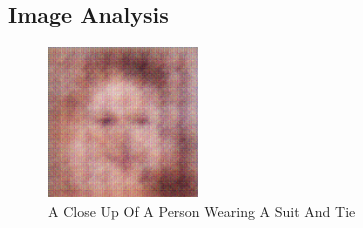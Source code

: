 \documentclass{article}%
\begin{document}
%
\subsection{Image Analysis}%
\label{subsec:ImageAnalysis}%


\begin{figure}[h!]%
\centering%
\includegraphics[width=150px]{500_fake_images/samples_5_318.png}%
\caption{A Close Up Of A Person Wearing A Suit And Tie}%
\end{figure}

%
\end{document}
